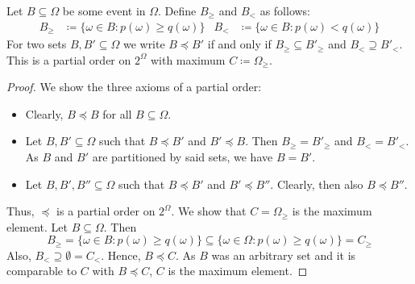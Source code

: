         \begin{solution}
            \begin{lemma}  \label{lm:task033a}
                Let \(B \subseteq \Omega\) be some event in \(\Omega\). Define \(B_\geq\) and \(B_<\) as follows:
                \begin{align}
                    B_\geq &\coloneqq \bigl\{ \omega \in B : p(\omega) \geq q(\omega) \bigr\} &
                    B_< &\coloneqq \bigl\{ \omega \in B : p(\omega) < q(\omega) \bigr\}
                \end{align}
                For two sets \(B, B' \subseteq \Omega\) we write \(B \preceq B'\) if and only if \(B_\geq \subseteq B'_\geq\) and \(B_< \supseteq B'_<\). This is a partial order on \(2^\Omega\) with maximum \(C \coloneqq \Omega_\geq\).
            \end{lemma}
            \begin{proof}
                We show the three axioms of a partial order:
                \begin{itemize}
                    \item Clearly, \(B \preceq B\) for all \(B \subseteq \Omega\).
                    \item Let \(B, B' \subseteq \Omega\) such that \(B \preceq B'\) and \(B' \preceq B\). Then \(B_\geq = B'_\geq\) and \(B_< = B'_<\). As \(B\) and \(B'\) are partitioned by said sets, we have \(B = B'\).
                    \item Let \(B, B', B'' \subseteq \Omega\) such that \(B \preceq B'\) and \(B' \preceq B''\). Clearly, then also \(B \preceq B''\).
                \end{itemize}
                Thus, \(\preceq\) is a partial order on \(2^\Omega\). We show that \(C = \Omega_\geq\) is the maximum element. Let \(B \subseteq \Omega\). Then
                \begin{equation}
                    B_\geq
                        = \bigl\{ \omega \in B : p(\omega) \geq q(\omega) \bigr\}
                        \subseteq \bigl\{ \omega \in \Omega : p(\omega) \geq q(\omega) \bigr\}
                        = C_\geq
                \end{equation}
                Also, \(B_< \supseteq \emptyset = C_<\). Hence, \(B \preceq C\). As \(B\) was an arbitrary set and it is comparable to \(C\) with \(B \preceq C\), \(C\) is the maximum element.
            \end{proof}


\end{solution}

